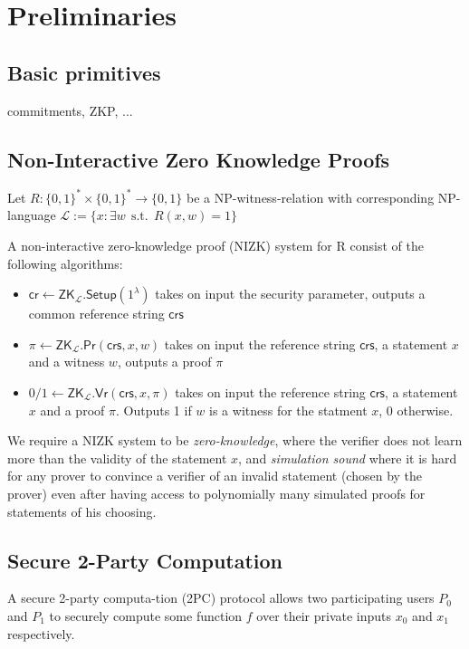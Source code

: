 
\section{Preliminaries}

\subsection{Basic primitives}

\begin{todobox}
    commitments, ZKP, ...
\end{todobox}
\subsection{Non-Interactive Zero Knowledge Proofs}

Let $R: \{0, 1\}^* \times \{0, 1\}^* \rightarrow \{0, 1\}$ be a NP-witness-relation with corresponding NP-language $\mathcal{L} := \{x : \exists w \:\: \text{s.t.} \:\: R(x, w) = 1\}$

A non-interactive zero-knowledge proof (NIZK) system for R consist of the following algorithms:
\begin{itemize}
    \item $\mathsf{cr} \gets \mathsf{ZK}_\mathcal{L}.\mathsf{Setup}(1^\lambda)$ takes on input the security parameter, outputs a common reference string $\mathsf{crs}$
    \item $\pi \gets \mathsf{ZK}_\mathcal{L}.\mathsf{Pr}(\mathsf{crs}, x, w)$ takes on input the reference string $\mathsf{crs}$, a statement $x$ and a witness $w$, outputs a proof $\pi$
    \item $0/1 \gets \mathsf{ZK}_\mathcal{L}.\mathsf{Vr}(\mathsf{crs}, x,\pi)$ takes on input the reference string $\mathsf{crs}$, a statement $x$ and a proof $\pi$. Outputs 1 if $w$ is a witness for the statment $x$, 0 otherwise.
\end{itemize}
We require a NIZK system to be \textit{zero-knowledge}, where the verifier does not learn more than the validity of the statement $x$, and \textit{simulation sound} where it is hard for any prover
to convince a verifier of an invalid statement (chosen by the prover) even after having access to polynomially many simulated proofs for statements of his choosing.

\subsection{Secure 2-Party Computation}
A secure 2-party computa-tion (2PC) protocol allows two participating users $P_0$ and $P_1$ to securely compute some function $f$ over their private inputs $x_0$ and $x_1$ respectively.

